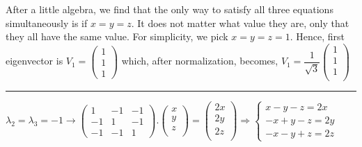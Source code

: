 \documentclass[fleqn]{article}
\begin{document}
\begin{enumerate}
      \textcolor{hwColor}{
        After a little algebra, we find that the only way to satisfy all three equations simultaneously is if $x=y=z$. It does not matter what value they are, only that they all have the same value. For simplicity, we pick $x=y=z=1$.
        Hence, first eigenvector is 
        $
        V_1=\begin{pmatrix}
          1 \\
          1 \\
          1
        \end{pmatrix}
        $
        which, after normalization, becomes, $V_1=\dfrac{1}{\sqrt{3}} \begin{pmatrix}
          1 \\
          1 \\
          1 \\
        \end{pmatrix}
        $
      }

      \textcolor{hwColor}{
        \rule{16cm}{0.4pt}
      }

      \bigbreak

      \textcolor{hwColor}{
        $
        \lambda_2=\lambda_3=-1 \rightarrow
        \begin{pmatrix}
          1 & -1 & -1 \\
          -1 & 1 & -1 \\
          -1 & -1 & 1
        \end{pmatrix}.\begin{pmatrix}
          x \\
          y \\
          z \\
        \end{pmatrix}=\begin{pmatrix}
          2x \\
          2y \\
          2z \\
        \end{pmatrix}
        \Longrightarrow
        \begin{cases}
          x-y-z=2x \\
          -x+y-z=2y \\
          -x-y+z=2z
        \end{cases}
        $
      }


\end{enumerate}
\end{document}
